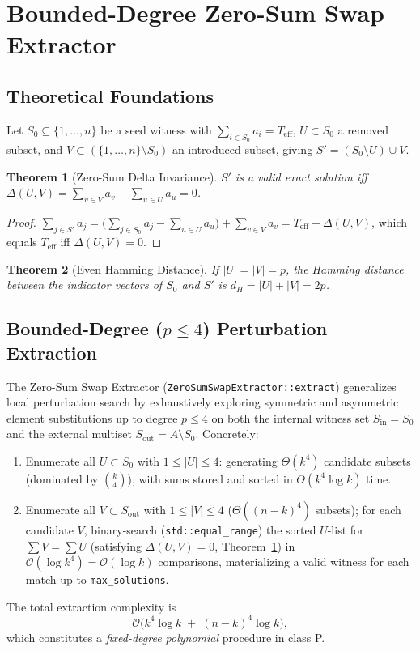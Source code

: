 \documentclass[journal,onecolumn,11pt]{IEEEtran}
\newtheorem{theorem}{Theorem}
\begin{document}
\section{Bounded-Degree Zero-Sum Swap Extractor}
\label{sec:swap_manifold}

\subsection{Theoretical Foundations}
Let $S_0\subseteq\{1,\dots,n\}$ be a seed witness with $\sum_{i\in S_0}a_i=T_{\text{eff}}$, $U\subset S_0$ a removed subset, and $V\subset(\{1,\dots,n\}\setminus S_0)$ an introduced subset, giving $S' = (S_0\setminus U)\cup V$.

\begin{theorem}[Zero-Sum Delta Invariance]
\label{thm:zero_sum}
$S'$ is a valid exact solution iff $\Delta(U,V) = \sum_{v\in V}a_v - \sum_{u\in U}a_u = 0$.
\end{theorem}
\begin{proof}
$\sum_{j\in S'}a_j = \big(\sum_{j\in S_0}a_j - \sum_{u\in U}a_u\big) + \sum_{v\in V}a_v = T_{\text{eff}} + \Delta(U,V)$, which equals $T_{\text{eff}}$ iff $\Delta(U,V)=0$.
\end{proof}

\begin{theorem}[Even Hamming Distance]
\label{thm:hamming}
If $|U|=|V|=p$, the Hamming distance between the indicator vectors of $S_0$ and $S'$ is $d_H = |U|+|V| = 2p$.
\end{theorem}

\subsection{Bounded-Degree ($p \le 4$) Perturbation Extraction}
The Zero-Sum Swap Extractor (\texttt{ZeroSumSwapExtractor::extract}) generalizes local perturbation search by exhaustively exploring symmetric and asymmetric element substitutions up to degree $p \le 4$ on both the internal witness set $S_{\text{in}} = S_0$ and the external multiset $S_{\text{out}} = A \setminus S_0$. Concretely:
\begin{enumerate}
    \item Enumerate all $U\subset S_0$ with $1\le|U|\le4$: generating $\Theta(k^4)$ candidate subsets (dominated by $\binom{k}{4}$), with sums stored and sorted in $\Theta(k^4\log k)$ time.
    \item Enumerate all $V\subset S_{\text{out}}$ with $1\le|V|\le4$ ($\Theta((n-k)^4)$ subsets); for each candidate $V$, binary-search (\texttt{std::equal\_range}) the sorted $U$-list for $\sum V = \sum U$ (satisfying $\Delta(U,V)=0$, Theorem~\ref{thm:zero_sum}) in $\mathcal{O}(\log k^4)=\mathcal{O}(\log k)$ comparisons, materializing a valid witness for each match up to \texttt{max\_solutions}.
\end{enumerate}
The total extraction complexity is
\begin{equation}
    \mathcal{O}\big(k^4\log k \;+\; (n-k)^4\log k\big),
\end{equation}
which constitutes a \emph{fixed-degree polynomial} procedure in class P.
\end{document}
